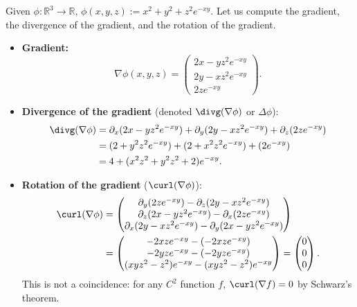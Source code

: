 \begin{example}
\label{ex:compute_operators}
Given $\phi : \mathbb{R}^3 \to \mathbb{R}$, $\phi(x,y,z) := x^2 + y^2 + z^2 e^{-xy}$.
Let us compute the gradient, the divergence of the gradient, and the rotation of the gradient.
\begin{itemize}
    \item \textbf{Gradient:}
    \[\nabla \phi(x,y,z) = \begin{pmatrix} 2x - yz^2 e^{-xy} \\ 2y - xz^2 e^{-xy} \\ 2z e^{-xy} \end{pmatrix}.\]
    
    \item \textbf{Divergence of the gradient} (denoted $\divg(\nabla \phi)$ or $\Delta \phi$):
    \begin{align*}
    \divg(\nabla \phi) &= \partial_x(2x - yz^2 e^{-xy}) + \partial_y(2y - xz^2 e^{-xy}) + \partial_z(2z e^{-xy}) \\
    &= (2 + y^2 z^2 e^{-xy}) + (2 + x^2 z^2 e^{-xy}) + (2 e^{-xy}) \\
    &= 4 + (x^2 z^2 + y^2 z^2 + 2) e^{-xy}.
    \end{align*}
    
    \item \textbf{Rotation of the gradient} ($\curl(\nabla \phi)$):
    \begin{align*}
    \curl(\nabla \phi) &= \begin{pmatrix} \partial_y(2z e^{-xy}) - \partial_z(2y - xz^2 e^{-xy}) \\ \partial_z(2x - yz^2 e^{-xy}) - \partial_x(2z e^{-xy}) \\ \partial_x(2y - xz^2 e^{-xy}) - \partial_y(2x - yz^2 e^{-xy}) \end{pmatrix} \\
    &= \begin{pmatrix} -2xz e^{-xy} - (-2xz e^{-xy}) \\ -2yz e^{-xy} - (-2yz e^{-xy}) \\ (xyz^2 - z^2) e^{-xy} - (xyz^2 - z^2) e^{-xy} \end{pmatrix} = \begin{pmatrix} 0 \\ 0 \\ 0 \end{pmatrix}.
    \end{align*}
    This is not a coincidence: for any $C^2$ function $f$, $\curl(\nabla f) = 0$ by Schwarz's theorem.
\end{itemize}
\end{example}

